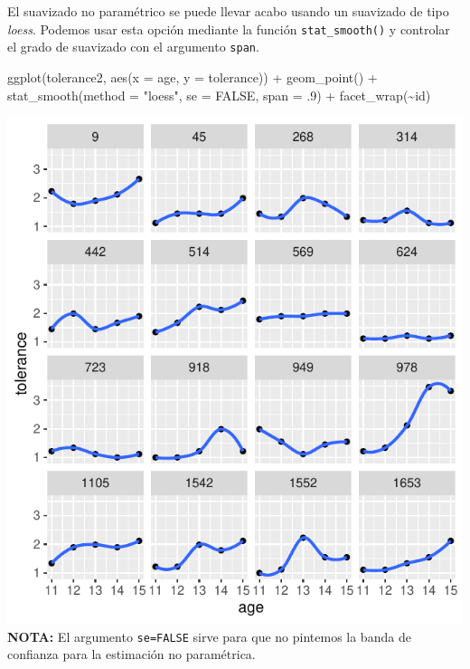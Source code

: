 \documentclass[
]{book}
\newenvironment{Shaded}{\begin{snugshade}}{\end{snugshade}}
\newcommand{\AttributeTok}[1]{\textcolor[rgb]{0.77,0.63,0.00}{#1}}
\newcommand{\ConstantTok}[1]{\textcolor[rgb]{0.00,0.00,0.00}{#1}}
\newcommand{\DecValTok}[1]{\textcolor[rgb]{0.00,0.00,0.81}{#1}}
\newcommand{\FunctionTok}[1]{\textcolor[rgb]{0.00,0.00,0.00}{#1}}
\newcommand{\NormalTok}[1]{#1}
\newcommand{\SpecialCharTok}[1]{\textcolor[rgb]{0.00,0.00,0.00}{#1}}
\newcommand{\StringTok}[1]{\textcolor[rgb]{0.31,0.60,0.02}{#1}}
\begin{document}
El suavizado no paramétrico se puede llevar acabo usando un suavizado de tipo \emph{loess}. Podemos usar esta opción mediante la función \texttt{stat\_smooth()} y controlar el grado de suavizado con el argumento \texttt{span}.

\begin{Shaded}
\begin{Highlighting}[]
\FunctionTok{ggplot}\NormalTok{(tolerance2, }\FunctionTok{aes}\NormalTok{(}\AttributeTok{x =}\NormalTok{ age, }\AttributeTok{y =}\NormalTok{ tolerance)) }\SpecialCharTok{+}
  \FunctionTok{geom\_point}\NormalTok{() }\SpecialCharTok{+}
  \FunctionTok{stat\_smooth}\NormalTok{(}\AttributeTok{method =} \StringTok{"loess"}\NormalTok{, }\AttributeTok{se =} \ConstantTok{FALSE}\NormalTok{, }\AttributeTok{span =}\NormalTok{ .}\DecValTok{9}\NormalTok{) }\SpecialCharTok{+}
  \FunctionTok{facet\_wrap}\NormalTok{(}\SpecialCharTok{\textasciitilde{}}\NormalTok{id)}
\end{Highlighting}
\end{Shaded}

\includegraphics{fig_out/unnamed-chunk-37-1.pdf}
\textbf{NOTA:} El argumento \texttt{se=FALSE} sirve para que no pintemos la banda de confianza para la estimación no paramétrica.
\end{document}
